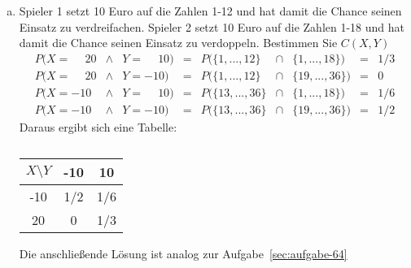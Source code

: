 \begin{enumerate}[(a)]
    \item Spieler 1 setzt 10 Euro auf die Zahlen 1-12 und hat damit die Chance
        seinen Einsatz zu verdreifachen. Spieler 2 setzt 10 Euro auf die Zahlen
        1-18 und hat damit die Chance seinen Einsatz zu verdoppeln. Bestimmen
        Sie $C(X, Y)$
        \begin{equation*}
            \begin{array}{lclclcrcl}
                 P(X = \phantom{-} 20 &\land& Y = \phantom{-} 10) &=& P(\{1,...,12\}  &\cap& \{1,...,18\})  &=& 1/3 \\[5pt]
                 P(X = \phantom{-} 20 &\land& Y =            -10) &=& P(\{1,...,12\}  &\cap& \{19,...,36\}) &=& 0 \\[5pt]
                 P(X =            -10 &\land& Y = \phantom{-} 10) &=& P(\{13,...,36\} &\cap& \{1,...,18\})  &=& 1/6 \\[5pt]
                 P(X =            -10 &\land& Y =            -10) &=& P(\{13,...,36\} &\cap& \{19,...,36\})  &=& 1/2
            \end{array}
        \end{equation*}
        Daraus ergibt sich eine Tabelle:

        \begin{table}[h]
            \centering
            \renewcommand{\arraystretch}{1.5}
            \begin{tabular}{c|c|c}
                $X \setminus Y$ & -10  & 10   \\ \hline
                -10             & 1/2  & 1/6  \\
                 20             & 0    & 1/3  \\
            \end{tabular}
            \caption{}
        \end{table}

        Die anschließende Lösung ist analog zur Aufgabe~\ref{sec:aufgabe-64}
\end{enumerate}
